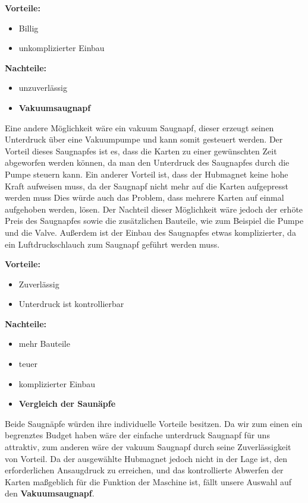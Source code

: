 \textbf{Vorteile:}
\begin{itemize}
    \item Billig
    \item unkomplizierter Einbau
\end{itemize}
\textbf{Nachteile:}
\begin{itemize}
    \item unzuverlässig
\end{itemize}

\begin{itemize}
    \item \textbf{Vakuumsaugnapf}
\end{itemize}
Eine andere Möglichkeit wäre ein vakuum Saugnapf, dieser erzeugt seinen Unterdruck über eine Vakuumpumpe und kann somit gesteuert werden. Der Vorteil dieses Saugnapfes ist es, dass die Karten zu einer gewünschten Zeit abgeworfen werden können, da man den
Unterdruck des Saugnapfes durch die Pumpe steuern kann. Ein anderer Vorteil ist, dass der Hubmagnet keine hohe Kraft aufweisen muss, da der Saugnapf nicht mehr auf die Karten aufgepresst werden muss Dies würde auch das Problem, dass mehrere Karten auf einmal
aufgehoben werden, lösen. Der Nachteil dieser Möglichkeit wäre jedoch der erhöte Preis des Saugnapfes sowie die zusätzlichen Bauteile, wie zum Beispiel die Pumpe und die Valve. Außerdem ist der Einbau des Saugnapfes etwas komplizierter, da ein Luftdruckschlauch
zum Saugnapf geführt werden muss.

\textbf{Vorteile:}
\begin{itemize}
    \item Zuverlässig
    \item Unterdruck ist kontrollierbar
\end{itemize}
\textbf{Nachteile:}
\begin{itemize}
    \item mehr Bauteile
    \item teuer
    \item komplizierter Einbau
\end{itemize}

\begin{itemize}
    \item \textbf{Vergleich der Saunäpfe}
\end{itemize}

Beide Saugnäpfe würden ihre individuelle Vorteile besitzen. Da wir zum einen ein begrenztes Budget haben wäre der einfache unterdruck Saugnapf für uns attraktiv, zum anderen wäre der vakuum Saugnapf durch seine Zuverlässigkeit von Vorteil.
Da der ausgewählte Hubmagnet jedoch nicht in der Lage ist, den erforderlichen Ansaugdruck zu erreichen, und das kontrollierte Abwerfen der Karten maßgeblich für die Funktion der Maschine ist, fällt unsere Auswahl auf den \textbf{Vakuumsaugnapf}.

